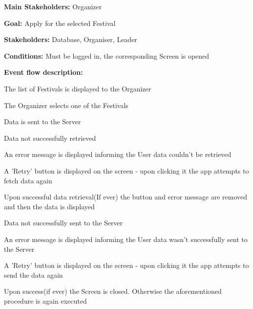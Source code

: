 			\noindent {}
			\begin{packed_item}
				\item \textbf{Main Stakeholders:} Organizer
				\item \textbf{Goal:} Apply for the selected Festival
				\item \textbf{Stakeholders: } Database, Organiser, Leader
				\item \textbf{Conditions: } Must be logged in, the corresponding Screen is opened
				\item \textbf{Event flow description: }
				\begin{packed_enum}
					\item The list of Festivals is displayed to the Organizer
					\item The Organizer selects one of the Festivals
					\item Data is sent to the Server
				\end{packed_enum}
				
				\begin{packed_item}
					\item[0.a] Data not successfully retrieved
					\item[] \begin{packed_enum}
						\item An error message is displayed informing the User data couldn't be retrieved
						\item A 'Retry' button is displayed on the screen - upon clicking it the app attempts to fetch data again
						\item Upon successful data retrieval(If ever) the button and error message are removed and then the data is displayed
					\end{packed_enum}
					
					\item[2.a] Data not successfully sent to the Server
					\item[] \begin{packed_enum}
						\item An error message is displayed informing the User data wasn't successfully sent to the Server
						\item A 'Retry' button is displayed on the screen - upon clicking it the app attempts to send the data again
						\item Upon success(if ever) the Screen is closed. Otherwise the aforementioned procedure is again executed
					\end{packed_enum}
				\end{packed_item}
			\end{packed_item}
			
